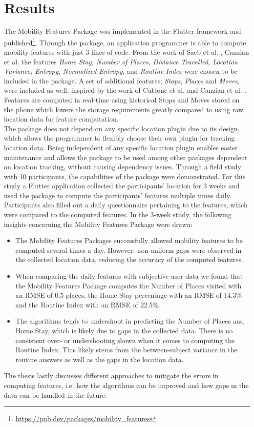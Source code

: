 \section{Results}
The Mobility Features Package was implemented in the Flutter framework and published\footnote{\url{https://pub.dev/packages/mobility_features}}. Through the package, an application programmer is able to compute mobility features with just 3 lines of code. From the work of Saeb et al. \cite{Saeb2015}, Canzian et al. \cite{Canzian2015} the features \textit{Home Stay, Number of Places, Distance Travelled, Location Variance, Entropy, Normalized Entropy,} and \textit{Routine Index} were chosen to be included in the package. A set of additional features: \textit{Stops}, \textit{Places} and \textit{Moves}, were included as well, inspired by the work of Cuttone et al. \cite{sparse-location-2014} and Canzian et al. \cite{Canzian2015}. Features are computed in real-time using historical Stops and Moves stored on the phone which lowers the storage requirements greatly compared to using raw location data for feature computation.\\

The package does not depend on any specific location plugin due to its design, which allows the programmer to flexibly choose their own plugin for tracking location data. Being independent of any specific location plugin enables easier maintenance and allows the package to be used among other packages dependent on location tracking, without causing dependency issues. Through a field study with 10 participants, the capabilities of the package were demonstrated. For this study a Flutter application collected the participants' location for 3 weeks and used the package to compute the participants' features multiple times daily. Participants also filled out a daily questionnaire pertaining to the features, which were compared to the computed features. In the 3-week study, the following insights concerning the Mobility Features Package were drawn:

\begin{itemize}
    \item The Mobility Features Packages successfully allowed mobility features to be computed several times a day. However, non-uniform gaps were observed in the collected location data, reducing the accuracy of the computed features. 
    
    \item When comparing the daily features with subjective user data we found that the Mobility Features Package computes the Number of Places visited with an RMSE of 0.5 places, the Home Stay percentage with an RMSE of 14.3\% and the Routine Index with an RMSE of 22.5\%.
    
    \item The algorithms tends to undershoot in predicting the Number of Places and Home Stay, which is likely due to gaps in the collected data. There is no consistent over- or undershooting shown when it comes to computing the Routine Index. This likely stems from the between-subject variance in the routine answers as well as the gaps in the location data.
\end{itemize}

The thesis lastly discusses different approaches to mitigate the errors in computing features, i.e. how the algorithms can be improved and how gaps in the data can be handled in the future. 